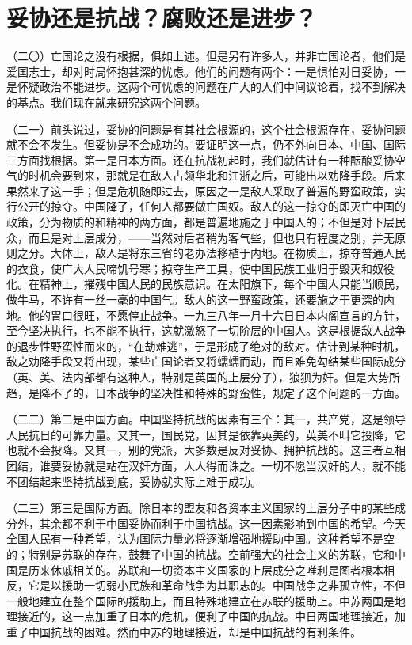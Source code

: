 \section{妥协还是抗战？腐败还是进步？}

（二〇）亡国论之没有根据，俱如上述。但是另有许多人，并非亡国论者，他们是爱国志士，却对时局怀抱甚深的忧虑。他们的问题有两个：一是惧怕对日妥协，一是怀疑政治不能进步。这两个可忧虑的问题在广大的人们中间议论着，找不到解决的基点。我们现在就来研究这两个问题。

（二一）前头说过，妥协的问题是有其社会根源的，这个社会根源存在，妥协问题就不会不发生。但妥协是不会成功的。要证明这一点，仍不外向日本、中国、国际三方面找根据。第一是日本方面。还在抗战初起时，我们就估计有一种酝酿妥协空气的时机会要到来，那就是在敌人占领华北和江浙之后，可能出以劝降手段。后来果然来了这一手；但是危机随即过去，原因之一是敌人采取了普遍的野蛮政策，实行公开的掠夺。中国降了，任何人都要做亡国奴。敌人的这一掠夺的即灭亡中国的政策，分为物质的和精神的两方面，都是普遍地施之于中国人的；不但是对下层民众，而且是对上层成分，——当然对后者稍为客气些，但也只有程度之别，并无原则之分。大体上，敌人是将东三省的老办法移植于内地。在物质上，掠夺普通人民的衣食，使广大人民啼饥号寒；掠夺生产工具，使中国民族工业归于毁灭和奴役化。在精神上，摧残中国人民的民族意识。在太阳旗下，每个中国人只能当顺民，做牛马，不许有一丝一毫的中国气。敌人的这一野蛮政策，还要施之于更深的内地。他的胃口很旺，不愿停止战争。一九三八年一月十六日日本内阁宣言的方针，至今坚决执行，也不能不执行，这就激怒了一切阶层的中国人。这是根据敌人战争的退步性野蛮性而来的，“在劫难逃”，于是形成了绝对的敌对。估计到某种时机，敌之劝降手段又将出现，某些亡国论者又将蠕蠕而动，而且难免勾结某些国际成分（英、美、法内部都有这种人，特别是英国的上层分子），狼狈为奸。但是大势所趋，是降不了的，日本战争的坚决性和特殊的野蛮性，规定了这个问题的一方面。

（二二）第二是中国方面。中国坚持抗战的因素有三个：其一，共产党，这是领导人民抗日的可靠力量。又其一，国民党，因其是依靠英美的，英美不叫它投降，它也就不会投降。又其一，别的党派，大多数是反对妥协、拥护抗战的。这三者互相团结，谁要妥协就是站在汉奸方面，人人得而诛之。一切不愿当汉奸的人，就不能不团结起来坚持抗战到底，妥协就实际上难于成功。

（二三）第三是国际方面。除日本的盟友和各资本主义国家的上层分子中的某些成分外，其余都不利于中国妥协而利于中国抗战。这一因素影响到中国的希望。今天全国人民有一种希望，认为国际力量必将逐渐增强地援助中国。这种希望不是空的；特别是苏联的存在，鼓舞了中国的抗战。空前强大的社会主义的苏联，它和中国是历来休戚相关的。苏联和一切资本主义国家的上层成分之唯利是图者根本相反，它是以援助一切弱小民族和革命战争为其职志的。中国战争之非孤立性，不但一般地建立在整个国际的援助上，而且特殊地建立在苏联的援助上。中苏两国是地理接近的，这一点加重了日本的危机，便利了中国的抗战。中日两国地理接近，加重了中国抗战的困难。然而中苏的地理接近，却是中国抗战的有利条件。

